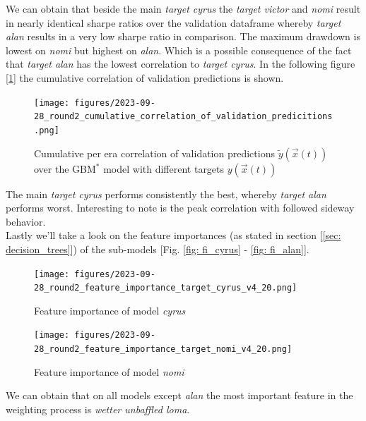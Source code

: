\documentclass[12pt, a4paper]{article}
\begin{document}
We can obtain that beside the main \textit{target cyrus} the \textit{target victor} and \textit{nomi} result in nearly identical sharpe ratios over the validation dataframe whereby \textit{target alan} results in a very low sharpe ratio in comparison. The maximum drawdown is lowest on \textit{nomi} but highest on \textit{alan}. Which is a possible consequence of the fact that \textit{target alan} has the lowest correlation to \textit{target cyrus}. In the following figure [\ref{fig: cum_corr_val_preds}] the cumulative correlation of validation predictions is shown.
\begin{figure}[!htpb]
    \centering
    \texttt{[image: figures/2023-09-28\_round2\_cumulative\_correlation\_of\_validation\_predicitions.png]}
    \caption[Cumulative per era correlation of validation predictions over the GBM$^{\ast}$ models with different targets]{Cumulative per era correlation of validation predictions $\tilde{y}(\vec{x}(t))$ over the GBM$^{\ast}$ model with different targets $y(\vec{x}(t))$}
    \label{fig: cum_corr_val_preds}    
\end{figure}
The main \textit{target cyrus} performs consistently the best, whereby \textit{target alan} performs worst. Interesting to note is the peak correlation with followed sideway behavior. \\
Lastly we'll take a look on the feature importances (as stated in section [\ref{sec: decision_trees}]) of the sub-models [Fig. \ref{fig: fi_cyrus} - \ref{fig: fi_alan}].
\begin{figure}[htbp]
\begin{minipage}[t]{7cm}
\vspace{0pt}
\centering
\texttt{[image: figures/2023-09-28\_round2\_feature\_importance\_target\_cyrus\_v4\_20.png]}
\caption[Feature importance of model cyrus]{Feature importance of model \textit{cyrus} }
\label{fig: fi_cyrus}  
\end{minipage}
\hfill
\begin{minipage}[t]{7cm}
\vspace{0pt}
\centering
\texttt{[image: figures/2023-09-28\_round2\_feature\_importance\_target\_nomi\_v4\_20.png]}
\caption[Feature importance of model nomi]{Feature importance of model \textit{nomi} }
\label{fig: fi_nomi}  
\end{minipage}
\end{figure}
We can obtain that on all models except \textit{alan} the most important feature in the weighting process is \textit{wetter unbaffled loma}. 
\end{document}
